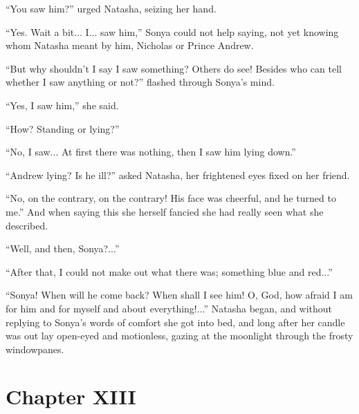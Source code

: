 ``You saw him?'' urged Natasha, seizing her hand.

``Yes. Wait a bit... I... saw him,'' Sonya could not help saying,
not yet knowing whom Natasha meant by him, Nicholas or Prince
Andrew.

``But why shouldn't I say I saw something? Others do see! Besides
who can tell whether I saw anything or not?'' flashed through
Sonya's mind.

``Yes, I saw him,'' she said.

``How? Standing or lying?''

``No, I saw... At first there was nothing, then I saw him lying
down.''

``Andrew lying? Is he ill?'' asked Natasha, her frightened eyes
fixed on her friend.

``No, on the contrary, on the contrary! His face was cheerful,
and he turned to me.'' And when saying this she herself fancied
she had really seen what she described.

``Well, and then, Sonya?...''

``After that, I could not make out what there was; something blue
and red...''

``Sonya! When will he come back? When shall I see him! O, God,
how afraid I am for him and for myself and about everything!...''
Natasha began, and without replying to Sonya's words of comfort
she got into bed, and long after her candle was out lay open-eyed
and motionless, gazing at the moonlight through the frosty
windowpanes.


\chapter*{Chapter XIII}
\ifaudio     
{} 
\fi

